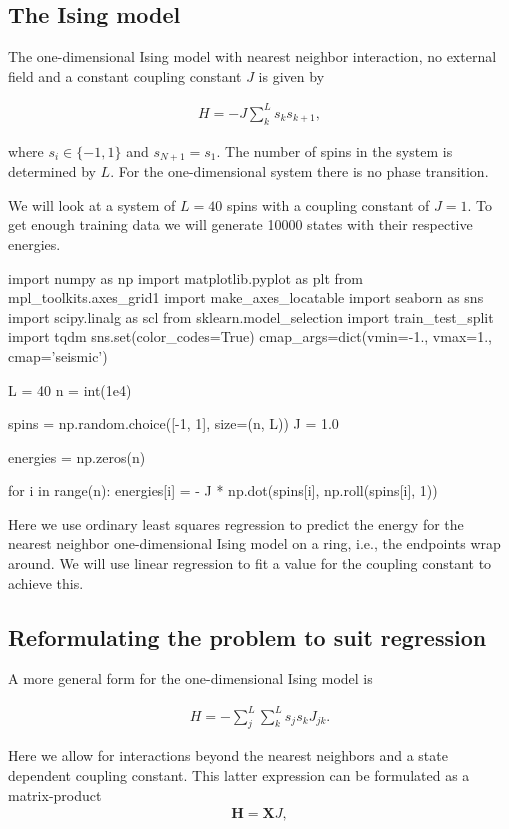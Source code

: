 \documentclass[%
oneside,                 %
final,                   %
10pt]{article}
\begin{document}
\subsection{The Ising model}

The one-dimensional Ising model with nearest neighbor interaction, no
external field and a constant coupling constant $J$ is given by

\begin{align}
    H = -J \sum_{k}^L s_k s_{k + 1},
\end{align}

where $s_i \in \{-1, 1\}$ and $s_{N + 1} = s_1$. The number of spins
in the system is determined by $L$. For the one-dimensional system
there is no phase transition.

We will look at a system of $L = 40$ spins with a coupling constant of
$J = 1$. To get enough training data we will generate 10000 states
with their respective energies.


\bpycod
import numpy as np
import matplotlib.pyplot as plt
from mpl_toolkits.axes_grid1 import make_axes_locatable
import seaborn as sns
import scipy.linalg as scl
from sklearn.model_selection import train_test_split
import tqdm
sns.set(color_codes=True)
cmap_args=dict(vmin=-1., vmax=1., cmap='seismic')

L = 40
n = int(1e4)

spins = np.random.choice([-1, 1], size=(n, L))
J = 1.0

energies = np.zeros(n)

for i in range(n):
    energies[i] = - J * np.dot(spins[i], np.roll(spins[i], 1))
\epycod

Here we use ordinary least squares
regression to predict the energy for the nearest neighbor
one-dimensional Ising model on a ring, i.e., the endpoints wrap
around. We will use linear regression to fit a value for
the coupling constant to achieve this.

\subsection{Reformulating the problem to suit regression}

A more general form for the one-dimensional Ising model is

\begin{align}
    H = - \sum_j^L \sum_k^L s_j s_k J_{jk}.
\end{align}

Here we allow for interactions beyond the nearest neighbors and a state dependent
coupling constant. This latter expression can be formulated as
a matrix-product
\begin{align}
    \bm{H} = \bm{X} J,
\end{align}
\end{document}

